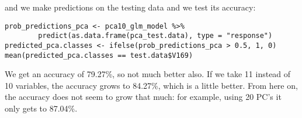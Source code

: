 \documentclass[10pt]{article}
\begin{document}
and we make predictions on the testing data and we test its accuracy:
\begin{verbatim}
prob_predictions_pca <- pca10_glm_model %>% 
        predict(as.data.frame(pca_test.data), type = "response")
predicted_pca.classes <- ifelse(prob_predictions_pca > 0.5, 1, 0)
mean(predicted_pca.classes == test.data$V169)
\end{verbatim}
We get an accuracy of 79.27\%, so not much better also. If we take 11 instead of 10 variables, the accuracy grows to 84.27\%, which is a little better. From here on, the accuracy does not seem to grow that much: for example, using 20 PC's it only gets to 87.04\%.
\end{document}
